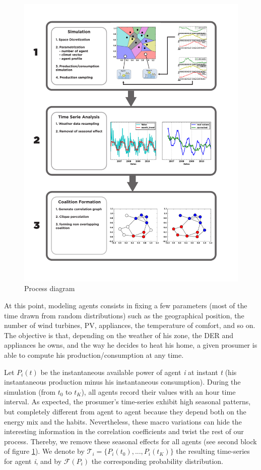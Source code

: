 \documentclass[conference]{IEEEtran}
\begin{document}
\begin{center}
\begin{figure}
\includegraphics[scale=0.45]{figure2/Fig2}
\caption{Process diagram}
\label{Fig1}
\end{figure}
\end{center}

At this point, modeling agents consists in fixing a few parameters (most of the time drawn from random distributions) such as the geographical position, the number of wind turbines, PV, appliances, the temperature of comfort, and so on. The objective is that, depending on the weather of his zone, the DER and appliances he owns, and the way he decides to heat his home, a given prosumer is able to compute his production/consumption at any time. 

Let $ P_{i}(t) $ be the instantaneous available power of agent \textit{i} at instant \textit{t} (his instantaneous production minus his instantaneous consumption). During the simulation (from $t_{0} $ to $ t_{K} $), all agents record their values with an hour time interval. As expected, the prosumer's time-series exhibit high seasonal patterns, but completely different from agent to agent because they depend both on the energy mix and the habits. Nevertheless, these macro variations can hide the interesting information in the correlation coefficients and twist the rest of our process. Thereby, we remove these seasonal effects for all agents (see second block of figure \ref{Fig1}). We denote by $ \mathcal{T}_{i} = \{ P_{i}(t_{0}),...,P_{i}(t_{K}) \} $ the resulting time-series for  agent \textit{i}, and by $ \mathcal{F}(P_{i}) $ the corresponding probability distribution.
\end{document}
